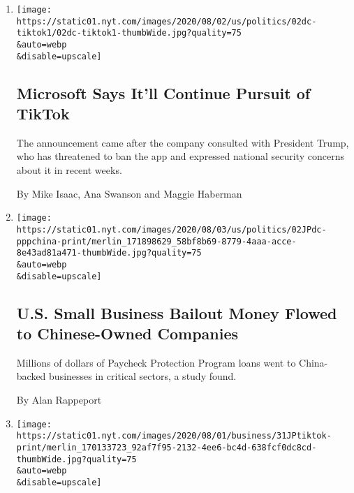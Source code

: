 \begin{enumerate}
\def\labelenumi{\arabic{enumi}.}
\item
  \href{/2020/08/02/business/economy/trump-tiktok-china-national-security.html}{}

  \texttt{[image: https://static01.nyt.com/images/2020/08/02/us/politics/02dc-tiktok1/02dc-tiktok1-thumbWide.jpg?quality=75\\\&auto=webp\\\&disable=upscale]}

  \hypertarget{microsoft-says-itll-continue-pursuit-of-tiktok}{%
  \subsection{Microsoft Says It'll Continue Pursuit of
  TikTok}\label{microsoft-says-itll-continue-pursuit-of-tiktok}}

  The announcement came after the company consulted with President
  Trump, who has threatened to ban the app and expressed national
  security concerns about it in recent weeks.

  By Mike Isaac, Ana Swanson and Maggie Haberman
\item
  \href{/2020/08/02/us/politics/virus-china-ppp-small-business-loans.html}{}

  \texttt{[image: https://static01.nyt.com/images/2020/08/03/us/politics/02JPdc-pppchina-print/merlin\_171898629\_58bf8b69-8779-4aaa-acce-8e43ad81a471-thumbWide.jpg?quality=75\\\&auto=webp\\\&disable=upscale]}

  \hypertarget{us-small-business-bailout-money-flowed-to-chinese-owned-companies}{%
  \subsection{U.S. Small Business Bailout Money Flowed to Chinese-Owned
  Companies}\label{us-small-business-bailout-money-flowed-to-chinese-owned-companies}}

  Millions of dollars of Paycheck Protection Program loans went to
  China-backed businesses in critical sectors, a study found.

  By Alan Rappeport
\item
  \href{/2020/07/31/technology/tiktok-microsoft.html}{}

  \texttt{[image: https://static01.nyt.com/images/2020/08/01/business/31JPtiktok-print/merlin\_170133723\_92af7f95-2132-4ee6-bc4d-638fcf0dc8cd-thumbWide.jpg?quality=75\\\&auto=webp\\\&disable=upscale]}

  \hypertarget{microsoft-said-to-be-in-talks-to-buy-tiktok-as-trump-weighs-curtailing-app}{%
}
\end{enumerate}
